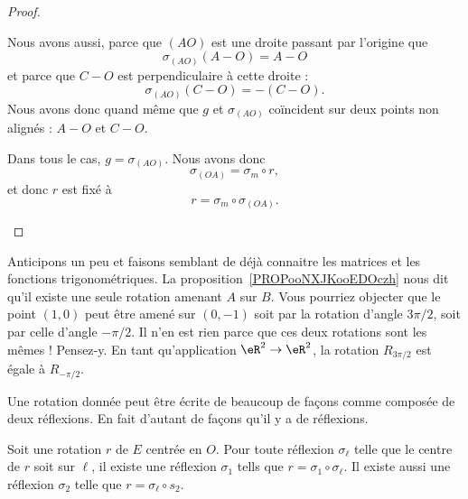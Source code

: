 \begin{proof}
\begin{subproof}
\begin{subproof}
            Nous avons aussi, parce que \( (AO)\) est une droite passant par l'origine que
            \begin{equation}
                \sigma_{(AO)}(A-O)=A-O
            \end{equation}
            et parce que \( C-O\) est perpendiculaire à cette droite :
            \begin{equation}
                \sigma_{(AO)}(C-O)=-(C-O).
            \end{equation}
            Nous avons donc quand même que \( g\) et \( \sigma_{(AO)}\) coïncident sur deux points non alignés : \( A-O\) et \( C-O\).

            \end{subproof}

            Dans tous le cas, \( g=\sigma_{(AO)}\). Nous avons donc
            \begin{equation}
                \sigma_{(OA)}=\sigma_m\circ r,
            \end{equation}
            et donc \( r\) est fixé à
            \begin{equation}
                r=\sigma_m\circ\sigma_{(OA)}.
            \end{equation}
    \end{subproof}
\end{proof}

\begin{normaltext}
    Anticipons un peu et faisons semblant de déjà connaitre les matrices et les fonctions trigonométriques. La proposition~\ref{PROPooNXJKooEDOczh} nous dit qu'il existe une seule rotation amenant \( A\) sur \( B\). Vous pourriez objecter que le point \( (1,0)\) peut être amené sur \( (0,-1)\) soit par la rotation d'angle \( 3\pi/2\), soit par celle d'angle \( -\pi/2\). Il n'en est rien parce que ces deux rotations sont les mêmes ! Pensez-y. En tant qu'application \( \eR^2\to \eR^2\), la rotation \( R_{3\pi/2}\) est égale à \( R_{-\pi/2}\).
\end{normaltext}

Une rotation donnée peut être écrite de beaucoup de façons comme composée de deux réflexions. En fait d'autant de façons qu'il y a de réflexions.
\begin{proposition}      \label{PROPooKAZEooLTHWKe}
    Soit une rotation \( r\) de \( E\) centrée en \( O\). Pour toute réflexion \( \sigma_{\ell}\) telle que le centre de \( r\) soit sur \( \ell\), il existe une réflexion \( \sigma_1\) tells que \( r=\sigma_1\circ\sigma_{\ell}\). Il existe aussi une réflexion \( \sigma_2\) telle que \( r=\sigma_{\ell}\circ s_2\).
\end{proposition}


